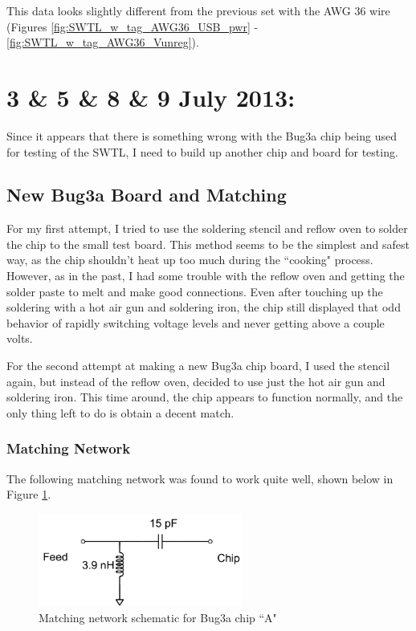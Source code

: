 \documentclass[12pt,onecolumn,titlepage]{article}
\begin{document}
This data looks slightly different from the previous set with the AWG 36 wire (Figures \ref{fig:SWTL_w_tag_AWG36_USB_pwr} - \ref{fig:SWTL_w_tag_AWG36_Vunreg}). 




\clearpage
\section{3 \& 5 \& 8 \& 9 July 2013:}

\indent \indent Since it appears that there is something wrong with the Bug3a chip being used for testing of the SWTL, I need to build up another chip and board for testing.


\subsection{New Bug3a Board and Matching}
\indent \indent For my first attempt, I tried to use the soldering stencil and reflow oven to solder the chip to the small test board. This method seems to be the simplest and safest way, as the chip shouldn't heat up too much during the ``cooking" process. However, as in the past, I had some trouble with the reflow oven and getting the solder paste to melt and make good connections. Even after touching up the soldering with a hot air gun and soldering iron, the chip still displayed that odd behavior of rapidly switching voltage levels and never getting above a couple volts. 

For the second attempt at making a new Bug3a chip board, I used the stencil again, but instead of the reflow oven, decided to use just the hot air gun and soldering iron. This time around, the chip appears to function normally, and the only thing left to do is obtain a decent match. 

\subsubsection{Matching Network}
\indent \indent The following matching network was found to work quite well, shown below in Figure \ref{fig:Bug3a_chipA_MN}.


\begin{figure}[htbp]
	\centering
	\includegraphics[width=0.6\textwidth]{Pictures/5July2013/Bug3a_chipA_MN}
	\caption{ Matching network schematic for Bug3a chip ``A" } 
	\label{fig:Bug3a_chipA_MN}
\end{figure}
\end{document}
